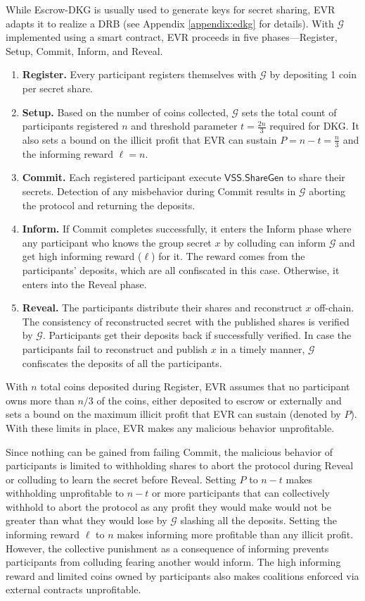 \documentclass[letterpaper,twocolumn,10pt]{article}
\theoremstyle{definition}
\theoremstyle{remark}
\begin{document}
While Escrow-DKG is usually used to generate keys for secret sharing, EVR adapts it to realize a DRB (see Appendix \ref{appendix:edkg} for details). With $\mathcal{G}$ implemented using a smart contract, EVR proceeds in five phases---Register, Setup, Commit, Inform, and Reveal.
\begin{enumerate}
    \item \textbf{Register.} Every participant registers themselves with $\mathcal{G}$ by depositing 1 coin per secret share.
    \item \textbf{Setup.} Based on the number of coins collected, $\mathcal{G}$ sets the total count of participants registered $n$ and threshold parameter $t = \frac{2n}{3}$ required for DKG. It also sets a bound on the illicit profit that EVR can sustain $P= n-t = \frac{n}{3}$ and the informing reward $\ell = n$.
    \item \textbf{Commit.} Each registered participant execute $\mathsf{VSS.ShareGen}$ to share their secrets. Detection of any misbehavior during Commit results in $\mathcal{G}$ aborting the protocol and returning the deposits.
     \item \textbf{Inform.} If Commit completes successfully, it enters the Inform phase where any participant who knows the group secret $x$ by colluding can inform $\mathcal{G}$ and get high informing reward ($\ell$) for it. The reward comes from the participants’ deposits, which are all confiscated in this case. Otherwise, it enters into the Reveal phase.
    \item \textbf{Reveal.} The participants distribute their shares and reconstruct $x$ off-chain. The consistency of reconstructed secret with the published shares is verified by $\mathcal{G}$. Participants get their deposits back if successfully verified. In case the participants fail to reconstruct and publish $x$ in a timely manner, $\mathcal{G}$ confiscates the deposits of all the participants.
\end{enumerate}
With $n$ total coins deposited during Register, EVR assumes that no participant owns more than $n/3$ of the coins, either deposited to escrow or externally and sets a bound on the maximum illicit profit that EVR can sustain (denoted by $P$). With these limits in place, EVR makes any malicious behavior unprofitable. 

Since nothing can be gained from failing Commit, the malicious behavior of participants is limited to withholding shares to abort the protocol during Reveal or colluding to learn the secret before Reveal. Setting $P$ to $n-t$ makes withholding unprofitable to $n-t$ or more participants that can collectively withhold to abort the protocol as any profit they would make would not be greater than what they would lose by $\mathcal{G}$ slashing all the deposits. Setting the informing reward $\ell$ to $n$ makes informing more profitable than any illicit profit. However, the collective punishment as a consequence of informing prevents participants from colluding fearing another would inform. The high informing reward and limited coins owned by participants also makes coalitions enforced via external contracts unprofitable.
\end{document}
